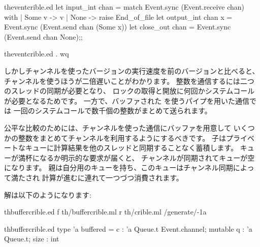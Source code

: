 \begin{example}
\begin{listingcodefile}{theventcrible.ed}
let input_int chan =
  match Event.sync (Event.receive chan) with
  | Some v -> v
  | None -> raise End_of_file
let output_int chan x = Event.sync (Event.send chan (Some x))
let close_out chan = Event.sync (Event.send chan None);;
\end{listingcodefile}
%
\begin{codefile}{theventcrible.ed}
.
wq
\end{codefile}

しかしチャンネルを使ったバージョンの実行速度を前のバージョンと比べると、
チャンネルを使うほうが二倍遅いことがわかります。
整数を通信するには二つのスレッドの同期が必要となり、
ロックの取得と開放に何回かシステムコールが必要となるためです。
一方で、バッファされた \io を使うパイプを用いた通信では
一回のシステムコールで数千個の整数がまとめて送られます。

公平な比較のためには、チャンネルを使った通信にバッファを用意して
いくつかの整数をまとめてチャンネルを利用するようにするべきです。
子はプライベートなキューに計算結果を他のスレッドと同期することなく蓄積します。
キューが満杯になるか明示的な要求が届くと、
チャンネルが同期されてキューが空になります。
親は自分用のキューを持ち、このキューはチャンネル同期によって満たされ
計算が進むに連れて一つづつ消費されます。

解は以下のようになります:
%
\begin{codefile}{thbuffercrible.ed}
f th/buffercrible.ml
r th/crible.ml
/generate/-1a
\end{codefile}
%
\begin{listingcodefile}{thbuffercrible.ed}
type 'a buffered =
    { c : 'a Queue.t Event.channel;
      mutable q : 'a Queue.t;
      size : int }


\end{listingcodefile}
\end{example}
